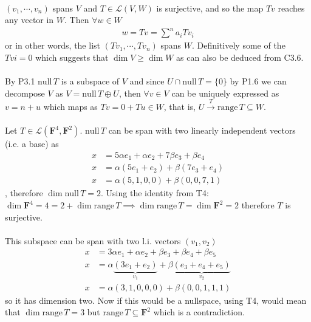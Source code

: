 \documentclass[11pt,notitlepage,oneside]{article}
\DeclareMathOperator{\dimension}{dim}
\newcommand{\exo}[1]{%
\addtocontents{toc}{\protect\setcounter{tocdepth}{2}}%
\paragraph{#1}}
\newcommand{\nullspace}[1]{\mathrm{null}\,{#1}}
\newcommand{\rangespace}[1]{\mathrm{range}\,{#1}}
\begin{document}
  \exo{} $(v_1,\cdots,v_n)$ spans $V$ and $T\in\mathcal{L}(V,W)$ is surjective, and 
  so the map $Tv$ reaches any vector in $W$. Then $\forall w\in W$ 
  \begin{align*}
    w = Tv = \sum^n a_i Tv_i
  \end{align*}
  or in other words, the list $(Tv_1,\cdots, Tv_n)$ spans $W$. Definitively some of the $Tvi=0$ which 
  suggests that $\dim{V}\geq \dim{W}$ as can also be deduced from C3.6. 
  
  
  \exo{} By P3.1 $\nullspace{T}$ is a subspace of $V$ and since $U \cap \nullspace{T} = \{0\}$ by P1.6 
  we can decompose $V$ as $V = \nullspace{T} \oplus U$, then $\forall v\in V$ can be uniquely expressed as 
  $v=n+u$ which maps as $Tv=0+Tu \in W$, that is, $U \xrightarrow{T} \rangespace{T} \subseteq W$.

  \exo{} Let  $T\in\mathcal{L}(\mathbf{F}^4, \mathbf{F}^2)$. $\nullspace{T}$ can be span with two linearly independent
  vectors (i.e. a base) as
  \begin{align*}
    x &= 5\alpha e_1 + \alpha e_2 + 7\beta e_3+ \beta e_4 \\
    x &= \alpha (5e_1 + e_2) + \beta (7e_3 + e_4) \\
    x &= \alpha (5,1,0,0) + \beta (0,0,7,1)
  \end{align*}
  , therefore $\dimension{\nullspace T} = 2$. 
  Using the identity from T4: $\dimension{\mathbf{F}^4} = 4 = 2 + \dimension{\rangespace{T}} \implies \dimension{\rangespace{T}} = \dimension{\mathbf{F}^2} = 2$ 
  therefore $T$ is surjective. 
  \exo{} This subspace can be span with two l.i. vectors $(v_1, v_2)$
  \begin{align*}
    x &= 3\alpha e_1 + \alpha e_2 + \beta e_3+ \beta e_4 + \beta e_5\\
    x &= \alpha \underbrace{(3e_1 + e_2)}_{v_1} + \beta \underbrace{(e_3 + e_4 + e_5)}_{v_2} \\
    x &= \alpha (3,1,0,0,0) + \beta (0, 0, 1,1,1)
  \end{align*}
  so it has dimension two. Now if this would be a nullspace, using T4, would mean that $\dimension{\rangespace{T}} = 3$
  but  $\rangespace{T} \subseteq \mathbf{F}^2$ which is a contradiction.
\end{document}
